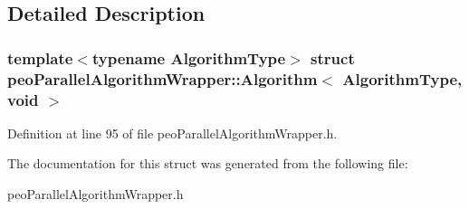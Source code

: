 \subsection{Detailed Description}
\subsubsection*{template$<$typename Algorithm\-Type$>$ struct peo\-Parallel\-Algorithm\-Wrapper::Algorithm$<$ Algorithm\-Type, void $>$}





Definition at line 95 of file peo\-Parallel\-Algorithm\-Wrapper.h.

The documentation for this struct was generated from the following file:\begin{CompactItemize}
\item 
peo\-Parallel\-Algorithm\-Wrapper.h\end{CompactItemize}
